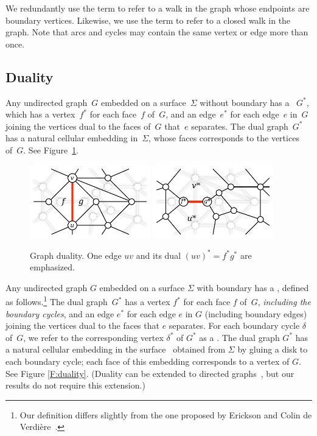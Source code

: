 \documentclass[11pt,twoside]{article}
\begin{document}
We redundantly use the term  to refer to a walk in the graph whose endpoints are boundary vertices.  Likewise, we use the term  to refer to a closed walk in the graph.  Note that arcs and cycles may contain the same vertex or edge more than once.

\subsection{Duality}


Any undirected graph~$G$ embedded on a surface~$\Sigma$ without boundary has a
~$G^*$, which has a vertex~$f^*$ for each face~$f$ of~$G$,
and an edge~$e^*$ for each edge~$e$ in~$G$ joining the vertices dual to the
faces of~$G$ that~$e$ separates. The dual graph~$G^*$ has a natural cellular
embedding in~$\Sigma$, whose faces corresponds to the vertices of~$G$.
See Figure~\ref{fig:prelims_primaldual}.


\begin{figure}[ht]
\centering
\includegraphics[height=1.25in]{Fig/primal}\quad
\includegraphics[height=1.25in]{Fig/dual}
\caption{Graph duality.  One edge $uv$ and its dual $(uv)^* =
f^*g^*$ are emphasized.} \label{fig:prelims_primaldual}
\end{figure}


Any undirected graph $G$ embedded on a surface $\Sigma$ with boundary has a , defined as follows.\footnote{Our definition differs slightly from the one proposed by Erickson and Colin de Verdi\`ere~\cite{octagons}.}  The dual graph~$G^*$ has a vertex $f^*$ for each face $f$ of~$G$, \emph{including the boundary cycles}, and an edge $e^*$ for each edge $e$ in $G$ (including boundary edges) joining the vertices dual to the faces that $e$ separates.  For each boundary cycle $\delta$ of~$G$, we refer to the corresponding vertex $\delta^*$ of $G^*$ as a .  The dual graph $G^*$ has a natural cellular embedding in the surface~\EMPH{$\Sigma^\bullet$} obtained from $\Sigma$ by gluing a disk to each boundary cycle; each face of this embedding corresponds to a vertex of $G$.  See Figure \ref{F:duality}.  (Duality can be extended to directed graphs~\cite{surflow}, but our results do not require this extension.)
\end{document}

